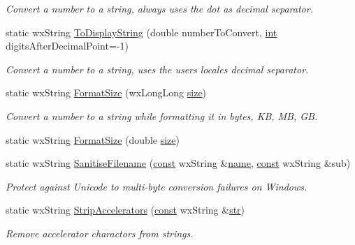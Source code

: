 \begin{DoxyCompactItemize}
\begin{DoxyCompactList}\small\item\em Convert a number to a string, always uses the dot as decimal separator. \end{DoxyCompactList}\item 
static wx\+String \hyperlink{class_internat_a1fa6d78784af32b72d5f9c69ae05accf}{To\+Display\+String} (double number\+To\+Convert, \hyperlink{xmltok_8h_a5a0d4a5641ce434f1d23533f2b2e6653}{int} digits\+After\+Decimal\+Point=-\/1)
\begin{DoxyCompactList}\small\item\em Convert a number to a string, uses the user\textquotesingle{}s locale\textquotesingle{}s decimal separator. \end{DoxyCompactList}\item 
static wx\+String \hyperlink{class_internat_aa5e69e42bc131186c044d11ef2cd63bd}{Format\+Size} (wx\+Long\+Long \hyperlink{group__lavu__mem_ga854352f53b148adc24983a58a1866d66}{size})
\begin{DoxyCompactList}\small\item\em Convert a number to a string while formatting it in bytes, KB, MB, GB. \end{DoxyCompactList}\item 
static wx\+String \hyperlink{class_internat_ad4cffca2e6eb338b39f867a3afa25529}{Format\+Size} (double \hyperlink{group__lavu__mem_ga854352f53b148adc24983a58a1866d66}{size})
\item 
static wx\+String \hyperlink{class_internat_af0ca210ff375aea1a46275f2da2d558d}{Sanitise\+Filename} (\hyperlink{getopt1_8c_a2c212835823e3c54a8ab6d95c652660e}{const} wx\+String \&\hyperlink{lib_2expat_8h_a1b49b495b59f9e73205b69ad1a2965b0}{name}, \hyperlink{getopt1_8c_a2c212835823e3c54a8ab6d95c652660e}{const} wx\+String \&sub)
\begin{DoxyCompactList}\small\item\em Protect against Unicode to multi-\/byte conversion failures on Windows. \end{DoxyCompactList}\item 
static wx\+String \hyperlink{class_internat_ab965a9ccf974e5356fa3e356bb9157d4}{Strip\+Accelerators} (\hyperlink{getopt1_8c_a2c212835823e3c54a8ab6d95c652660e}{const} wx\+String \&\hyperlink{sndfile__save_8m_a4b99ff73a8a869319570237b5c57ab03}{str})
\begin{DoxyCompactList}\small\item\em Remove accelerator charactors from strings. \end{DoxyCompactList}\end{DoxyCompactItemize}


